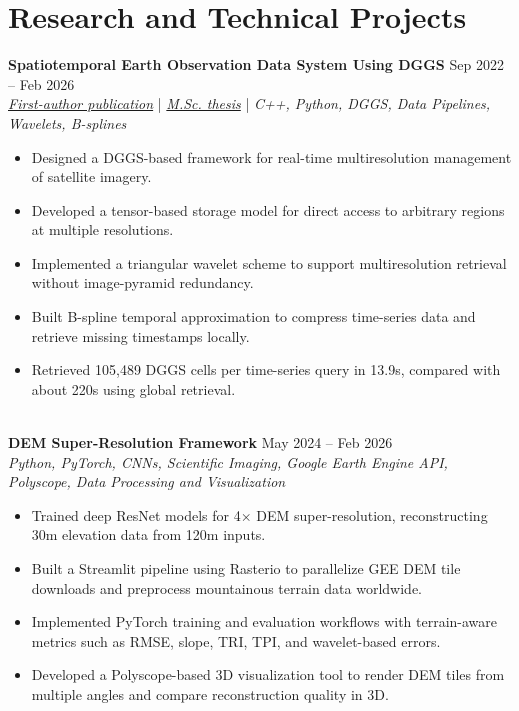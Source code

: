 \documentclass[a4paper,10pt]{article}
\begin{document}

\section*{Research and Technical Projects}

\noindent
\textbf{Spatiotemporal Earth Observation Data System Using DGGS} \hfill Sep 2022 -- Feb 2026 \\
\textit{\href{https://doi.org/10.3390/rs17040570}{First-author publication}} | \textit{\href{https://ucalgary.scholaris.ca/items/114b394b-e516-4732-bd3a-45dd6160d480}{M.Sc. thesis}} | \textit{C++, Python, DGGS, Data Pipelines, Wavelets, B-splines}
\begin{itemize}[leftmargin=0.25in]
    \item Designed a DGGS-based framework for real-time multiresolution management of satellite imagery.
    \item Developed a tensor-based storage model for direct access to arbitrary regions at multiple resolutions.
    \item Implemented a triangular wavelet scheme to support multiresolution retrieval without image-pyramid redundancy.
    \item Built B-spline temporal approximation to compress time-series data and retrieve missing timestamps locally.
    \item Retrieved 105,489 DGGS cells per time-series query in 13.9s, compared with about 220s using global retrieval.
\end{itemize}

\noindent \\
\textbf{DEM Super-Resolution Framework} \hfill May 2024 -- Feb 2026 \\
\textit{Python, PyTorch, CNNs, Scientific Imaging, Google Earth Engine API, Polyscope, Data Processing and Visualization}
\begin{itemize}[leftmargin=0.25in]
    \item Trained deep ResNet models for 4$\times$ DEM super-resolution, reconstructing 30m elevation data from 120m inputs.
    \item Built a Streamlit pipeline using Rasterio to parallelize GEE DEM tile downloads and preprocess mountainous terrain data worldwide.
    \item Implemented PyTorch training and evaluation workflows with terrain-aware metrics such as RMSE, slope, TRI, TPI, and wavelet-based errors.
    \item Developed a Polyscope-based 3D visualization tool to render DEM tiles from multiple angles and compare reconstruction quality in 3D.
\end{itemize}
\end{document}
